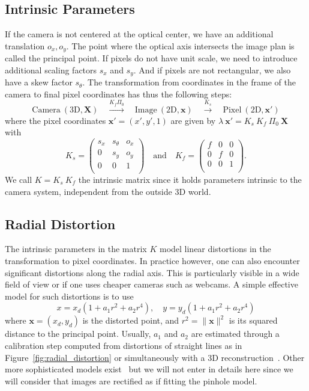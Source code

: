 \subsection{Intrinsic Parameters}%
\label{sub:intrinsic_parameters}


If the camera is not centered at the optical center, we have an additional
translation $o_x, o_y$. The point where the optical axis intersects
the image plan is called the principal point.
If pixels do not have unit scale, we need to introduce
additional scaling factors $s_x$ and $s_y$.
And if pixels are not rectangular, we also have a skew factor $s_{\theta}$.
The transformation from coordinates in the frame of the camera
to final pixel coordinates has thus the following steps:
\[
	\text{Camera}\ (\text{3D}, \bm{X})
		\quad \overset{K_f\Pi_0}{\longrightarrow} \quad
			\text{Image}\ (\text{2D}, \bm{x})
		\quad \overset{K_s}{\longrightarrow} \quad
			\text{Pixel}\ (\text{2D}, \bm{x'})
\]
where the pixel coordinates $\bm{x'} = (x',y',1)$ are given by
$\lambda\ \bm{x'} = K_s\ K_f\ \Pi_0\ \bm{X}$
with
\[K_s = \begin{pmatrix}
		s_x & s_{\theta} & o_x \\
		0 & s_y & o_y \\
		0 & 0 & 1 \\
	\end{pmatrix}
	\quad \text{and} \quad K_f =
	\begin{pmatrix}
		f & 0 & 0 \\
		0 & f & 0 \\
		0 & 0 & 1 \\
	\end{pmatrix}.
\]
We call $K = K_s\ K_f$ the intrinsic matrix since it holds
parameters intrinsic to the camera system, independent from
the outside 3D world.


\subsection{Radial Distortion}%
\label{sub:radial_distortion}

The intrinsic parameters in the matrix $K$ model linear distortions
in the transformation to pixel coordinates.
In practice however, one can also encounter significant
distortions along the radial axis.
This is particularly visible in a wide field of view
or if one uses cheaper cameras such as webcams.
A simple effective model for such distortions is to use
\[
	x = x_d ( 1 + a_1 r^2 + a_2 r^4 ),\quad
	y = y_d ( 1 + a_1 r^2 + a_2 r^4 )
\]
where $\bm{x} = (x_d, y_d)$ is the distorted point,
and $r^2 = \|\bm{x}\|^2$ is its squared distance to the principal point.
Usually, $a_1$ and $a_2$ are estimated through a calibration step computed from
distortions of straight lines as in Figure~\ref{fig:radial_distortion}
or simultaneously with a 3D reconstruction~\cite{stein1997lens, fitzgibbon2001simultaneous}.
Other more sophisticated models exist~\cite{devernay1995automatic}
but we will not enter in details here since we will consider
that images are rectified as if fitting the pinhole model.

